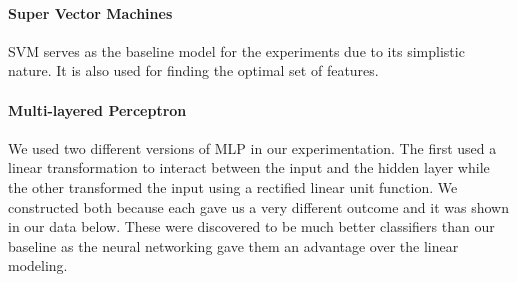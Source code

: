 \paragraph{Super Vector Machines}
SVM serves as the baseline model for the experiments due to its simplistic
nature. It is also used for finding the optimal set of features.
\paragraph{Multi-layered Perceptron}
We used two different versions of MLP in our experimentation. The first used a
linear transformation to interact between the input and the hidden layer while
the other transformed the input using a rectified linear unit function. We
constructed both because each gave us a very different outcome and it was shown
in our data below. These were discovered to be much better classifiers than our
 baseline as the neural networking gave them an advantage over the linear
 modeling.
